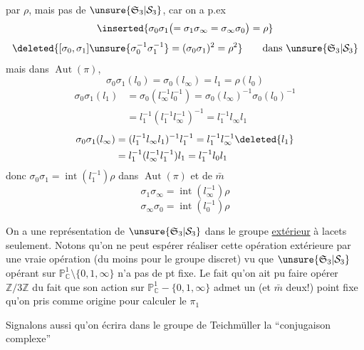par $\rho$, mais pas de $\unsure{\mathfrak S_3|\mathcal S_3}$, car on a p.ex
\[
\inserted{\sigma_0\sigma_1\bigl(=\sigma_1\sigma_\infty=\sigma_\infty\sigma_0\bigr)=\rho}
\]
\[
\deleted{[\sigma_0,\sigma_1]\unsure{\sigma_0^{-1}\sigma_1^{-1}}=(\sigma_0\sigma_1)^2=\rho^2}\qquad\text{dans }\unsure{\mathfrak S_3|\mathcal S_3}
\]
mais dans $\operatorname{Aut}(\pi)$, 
\[
\sigma_0\sigma_1(l_0)=\sigma_0(l_\infty)=l_1=\rho(l_0)
\]
\[
\begin{aligned}
\sigma_0\sigma_1(l_1)&=\sigma_0(l_\infty^{-1}l_0^{-1})=\sigma_0(l_\infty)^{-1}\sigma_0(l_0)^{-1}\\
&=l_1^{-1}(l_1^{-1}l_\infty^{-1})^{-1}=l_1^{-1}l_\infty l_1
\end{aligned}
\]
\[
\begin{aligned}
\sigma_0\sigma_1(l_\infty)&=(l_1^{-1}l_\infty l_1)^{-1}l_1^{-1}=l_1^{-1}l_\infty^{-1}\deleted{l_1}\\
&=l_1^{-1}(l_\infty^{-1}l_1^{-1})l_1=l_1^{-1}l_0l_1
\end{aligned}
\]
donc $\sigma_0\sigma_1=\operatorname{int}(l_1^{-1})\rho$ dans $\operatorname{Aut}(\pi)$
et de $\bar m$
\[
\sigma_1\sigma_\infty=\operatorname{int}(l_\infty^{-1})\rho
\]
\[
\sigma_\infty\sigma_0=\operatorname{int}(l_0^{-1})\rho
\]

On a une représentation de $\unsure{\mathfrak S_3|\mathcal S_3}$ dans le groupe \uline{extérieur} à lacets seulement. Notons qu'on ne peut espérer réaliser cette opération extérieure par une vraie opération (du moins pour le groupe discret) vu que $\unsure{\mathfrak S_3|\mathcal S_3}$ opérant sur $\mathbb P^1_{\mathbb C}\setminus\{0,1,\infty\}$ n'a pas de pt fixe. Le fait qu'on ait pu faire opérer $\mathbb Z/3\mathbb Z$   du fait que son action sur $\mathbb P^1_{\mathbb C}-\{0,1,\infty\}$ admet un (et $\bar m$ deux!) point fixe qu'on   pris comme origine pour calculer le $\pi_1$

Signalons aussi qu'on écrira dans le groupe de Teichmüller  la ``conjugaison complexe''
